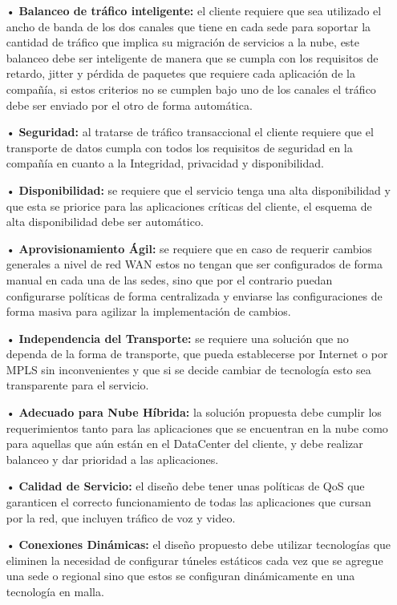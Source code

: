 \begin{itemize}
\item[•] \textbf{Balanceo de tráfico inteligente:} el cliente requiere que sea utilizado el ancho de banda de los dos canales que tiene en cada sede para soportar la cantidad de tráfico que implica su migración de servicios a la nube, este balanceo debe ser inteligente de manera que se cumpla con los requisitos de retardo, jitter y pérdida de paquetes que requiere cada aplicación de la compañía, si estos criterios no se cumplen bajo uno de los canales el tráfico debe ser enviado por el otro de forma automática.

\item[•] \textbf{Seguridad:} al tratarse de tráfico transaccional el cliente requiere que el transporte de datos cumpla con todos los requisitos de seguridad en la compañía en cuanto a la Integridad, privacidad y disponibilidad.

\item[•] \textbf{Disponibilidad:} se requiere que el servicio tenga una alta disponibilidad y que esta se priorice para las aplicaciones críticas del cliente, el esquema de alta disponibilidad debe ser automático.

\item[•] \textbf{Aprovisionamiento Ágil:} se requiere que en caso de requerir cambios generales a nivel de red WAN estos no tengan que ser configurados de forma manual en cada una de las sedes, sino que por el contrario puedan configurarse políticas de forma centralizada y enviarse las configuraciones de forma masiva para agilizar la implementación de cambios.

\item[•] \textbf{Independencia del Transporte:} se requiere una solución que no dependa de la forma de transporte, que pueda establecerse por Internet o por MPLS sin inconvenientes y que si se decide cambiar de tecnología esto sea transparente para el servicio.

\item[•] \textbf{Adecuado para Nube Híbrida:} la solución propuesta debe cumplir los requerimientos tanto para las aplicaciones que se encuentran en la nube como para aquellas que aún están en el DataCenter del cliente, y debe realizar balanceo y dar prioridad a las aplicaciones.

\item[•] \textbf{Calidad de Servicio:} el diseño debe tener unas políticas de QoS que garanticen el correcto funcionamiento de todas las aplicaciones que cursan por la red, que incluyen tráfico de voz y video.                                 

\item[•] \textbf{Conexiones Dinámicas:} el diseño propuesto debe utilizar tecnologías que eliminen la necesidad de configurar túneles estáticos cada vez que se agregue una sede o regional sino que estos se configuran dinámicamente en una tecnología en malla.
\end{itemize}

